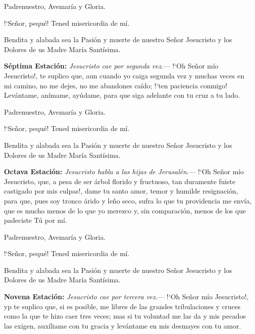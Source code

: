 Padrenuestro, Avemaría y Gloria.

{!`}Señor, pequé! Tened misericordia de mí.

Bendita y alabada sea la Pasión y muerte de nuestro Señor Jesucristo y los Dolores de us Madre María Santísima.

\vspace{2mm}

\textbf{Séptima Estación:} \textit{Jesucristo cae por segunda vez}.--- {!`}Oh Señor mío Jesucristo!, te suplico que, aun cuando yo caiga segunda vez y muchas veces en mi camino, no me dejes,
no me abandones caído; {!`}ten paciencia conmigo! Levántame, anímame, ayúdame, para que siga adelante con tu cruz a tu lado.

\vspace{2mm}

Padrenuestro, Avemaría y Gloria.

{!`}Señor, pequé! Tened misericordia de mí.

Bendita y alabada sea la Pasión y muerte de nuestro Señor Jesucristo y los Dolores de us Madre María Santísima.

\vspace{2mm}

\textbf{Octava Estación:} \textit{Jesucristo habla a las hijas de Jerusalén}.--- {!`}Oh Señor mío Jesucristo, que, a pesa de ser árbol florido y fructuoso, tan duramente fuiste castigado
por mis culpas!, dame tu santo amor, temor y humilde resignación, para que, pues soy tronco árido y leño seco, sufra lo que tu providencia me envía, que es mucho menos de lo que yo 
merezco y, sin comparación, menos de los que padeciste Tú por mí. 

\vspace{2mm}

Padrenuestro, Avemaría y Gloria.

{!`}Señor, pequé! Tened misericordia de mí.

Bendita y alabada sea la Pasión y muerte de nuestro Señor Jesucristo y los Dolores de us Madre María Santísima.

\vspace{2mm}

\textbf{Novena Estación:} \textit{Jesucristo cae por tercera vez}.--- {!`}Oh Señor mío Jesucristo!, yp te suplico que, si es posible, me libres de las grandes tribulaciones y cruces como la
que te hizo caer tres veces; mas si tu voluntad me las da y mis pecados las exigen, auxíliame con tu gracia y levántame en mis desmayes con tu amor.


